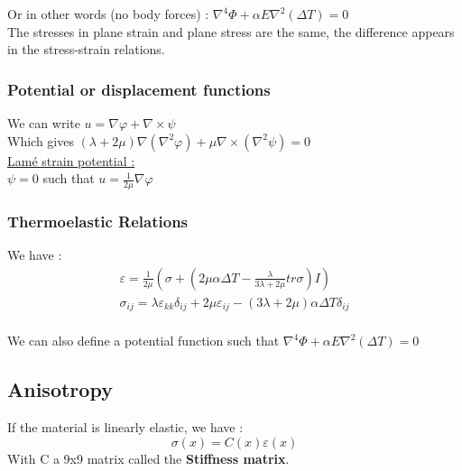 \documentclass[../main.tex]{subfiles}
\begin{document}
Or in other words (no body forces) : $\nabla^4 \Phi + \alpha E \nabla^2 (\Delta T)=0$\\

\warning The stresses in plane strain and plane stress are the same, the difference appears in the stress-strain relations.\\

\subsubsection{Potential or displacement functions}
We can write $u = \nabla \varphi + \nabla \times \psi$\\
Which gives $(\lambda + 2\mu) \nabla(\nabla^2\varphi) + \mu \nabla \times(\nabla^2 \psi)=0$\\

\quad \underline{Lamé strain potential :}\\
$\psi = 0$ such that $u = \frac{1}{2\mu} \nabla \varphi$\\


\subsubsection{Thermoelastic Relations}
We have : \begin{equation}
    \begin{gathered}
        \varepsilon = \frac{1}{2\mu} (\sigma + (2\mu \alpha \Delta T - \frac{\lambda}{3\lambda + 2\mu} tr\sigma) I)\\
        \sigma_{ij} = \lambda \varepsilon_{kk} \delta_{ij} + 2\mu \varepsilon_{ij} - (3\lambda + 2\mu) \alpha \Delta T \delta_{ij}\\
    \end{gathered}
\end{equation}


We can also define a potential function such that $\nabla^4 \Phi + \alpha E \nabla^2 (\Delta T)=0$\\

\subsection{Anisotropy}

If the material is linearly elastic, we have : \begin{equation}
    \sigma(x) = C(x) \varepsilon(x)
\end{equation}
With C a 9x9 matrix called the \textbf{Stiffness matrix}.\\
\end{document}
